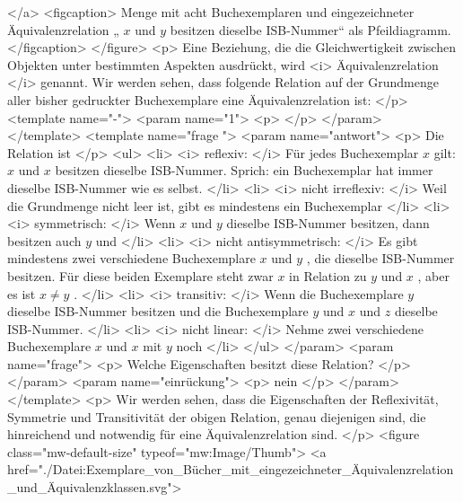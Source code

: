    </a>
   <figcaption>
    Menge mit acht Buchexemplaren und eingezeichneter Äquivalenzrelation „
    $x$
    und
    $y$
    besitzen dieselbe ISB-Nummer“ als Pfeildiagramm.
   </figcaption>
  </figure>
  <p>
   Eine Beziehung, die die Gleichwertigkeit zwischen Objekten unter bestimmten Aspekten ausdrückt, wird
   <i>
    Äquivalenzrelation
   </i>
   genannt. Wir werden sehen, dass folgende Relation auf der Grundmenge aller bisher gedruckter Buchexemplare eine Äquivalenzrelation ist:
  </p>
  <template name="-">
   <param name="1">
    <p>
    </p>
   </param>
  </template>
  <template name="frage
 ">
   <param name="antwort">
    <p>
     Die Relation ist
    </p>
    <ul>
     <li>
      <i>
       reflexiv:
      </i>
      Für jedes Buchexemplar
      $x$
      gilt:
      $x$
      und
      $x$
      besitzen dieselbe ISB-Nummer. Sprich: ein Buchexemplar hat immer dieselbe ISB-Nummer wie es selbst.
     </li>
     <li>
      <i>
       nicht irreflexiv:
      </i>
      Weil die Grundmenge nicht leer ist, gibt es mindestens ein Buchexemplar
     </li>
     <li>
      <i>
       symmetrisch:
      </i>
      Wenn
      $x$
      und
      $y$
      dieselbe ISB-Nummer besitzen, dann besitzen auch
      $y$
      und
     </li>
     <li>
      <i>
       nicht antisymmetrisch:
      </i>
      Es gibt mindestens zwei verschiedene Buchexemplare
      $x$
      und
      $y$
      , die dieselbe ISB-Nummer besitzen. Für diese beiden Exemplare steht zwar
      $x$
      in Relation zu
      $y$
      und
      $x$
      , aber es ist
      $x\ne y$
      .
     </li>
     <li>
      <i>
       transitiv:
      </i>
      Wenn die Buchexemplare
      $y$
      dieselbe ISB-Nummer besitzen und die Buchexemplare
      $y$
      und
      $x$
      und
      $z$
      dieselbe ISB-Nummer.
     </li>
     <li>
      <i>
       nicht linear:
      </i>
      Nehme zwei verschiedene Buchexemplare
      $x$
      und
      $x$
      mit
      $y$
      noch
     </li>
    </ul>
   </param>
   <param name="frage">
    <p>
     Welche Eigenschaften besitzt diese Relation?
    </p>
   </param>
   <param name="einrückung">
    <p>
     nein
    </p>
   </param>
  </template>
  <p>
   Wir werden sehen, dass die Eigenschaften der Reflexivität, Symmetrie und Transitivität der obigen Relation, genau diejenigen sind, die hinreichend und notwendig für eine Äquivalenzrelation sind.
  </p>
  <figure class="mw-default-size" typeof="mw:Image/Thumb">
   <a href="./Datei:Exemplare_von_Bücher_mit_eingezeichneter_Äquivalenzrelation_und_Äquivalenzklassen.svg">
